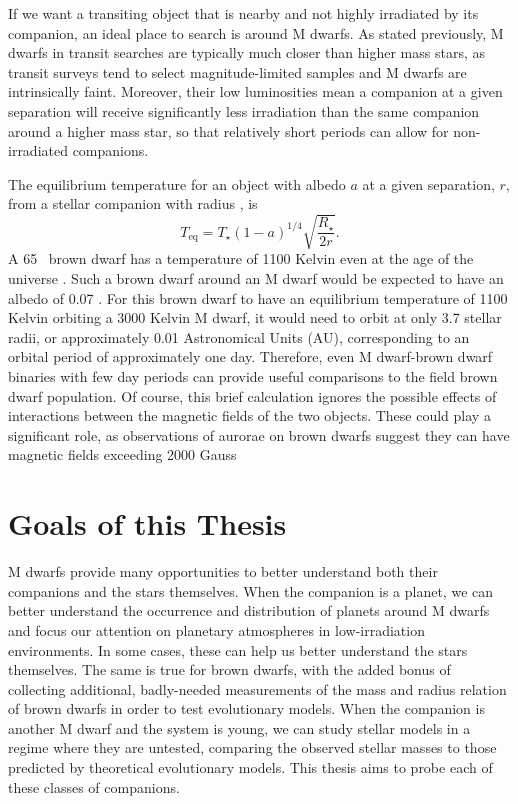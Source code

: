 If we want a transiting object that is nearby and not highly irradiated by its companion,
an ideal place to search is around M dwarfs. 
As stated previously, M dwarfs in transit searches are typically much closer than 
higher mass stars, as transit surveys tend to select magnitude-limited samples and
M dwarfs are intrinsically faint. 
Moreover, their low luminosities mean a companion at a given separation will receive
significantly less irradiation than the same companion around a higher mass star,
so that relatively short periods can allow for non-irradiated companions.

The equilibrium temperature for an object with albedo $a$ at a given separation, $r$, from a 
stellar companion with radius \rstar, is
\begin{equation}
T_{\textrm{eq}} = T_\star (1-a)^{1/4} \sqrt{\frac{R_\star}{2r}}.
\end{equation}
A 65 \mjup\ brown dwarf has a temperature of 1100 Kelvin even at the age of 
the universe \citep{Saumon08}. 
Such a brown dwarf around an M dwarf would be expected to have an albedo of
0.07 \citep{Marley99}.
For this brown dwarf to have an equilibrium temperature of 1100 Kelvin orbiting a
3000 Kelvin M dwarf, it would need to orbit at only 3.7 stellar radii, or approximately
0.01 Astronomical Units (AU), corresponding to an orbital period of approximately one day.
Therefore, even M dwarf-brown dwarf binaries with few day periods can provide useful 
comparisons to the field brown dwarf population.
Of course, this brief calculation ignores the possible effects of interactions between
the magnetic fields of the two objects. These could play a significant role, as 
observations of aurorae on brown dwarfs suggest they can have magnetic fields exceeding
2000 Gauss \citep{Hallinan15}





\section{Goals of this Thesis} 

M dwarfs provide many opportunities to better understand both their companions and
the stars themselves. 
When the companion is a planet, we can better understand the occurrence and distribution
of planets around M dwarfs and focus our attention on planetary atmospheres in
low-irradiation environments. 
In some cases, these can help us better understand the stars themselves.
The same is true for brown dwarfs, with the added bonus of collecting additional, 
badly-needed measurements of the mass and radius relation of brown dwarfs in order
to test evolutionary models.
When the companion is another M dwarf and the system is young, we can study stellar models
in a regime where they are untested, comparing the observed stellar masses to those
predicted by theoretical evolutionary models.
This thesis aims to probe each of these classes of companions.

